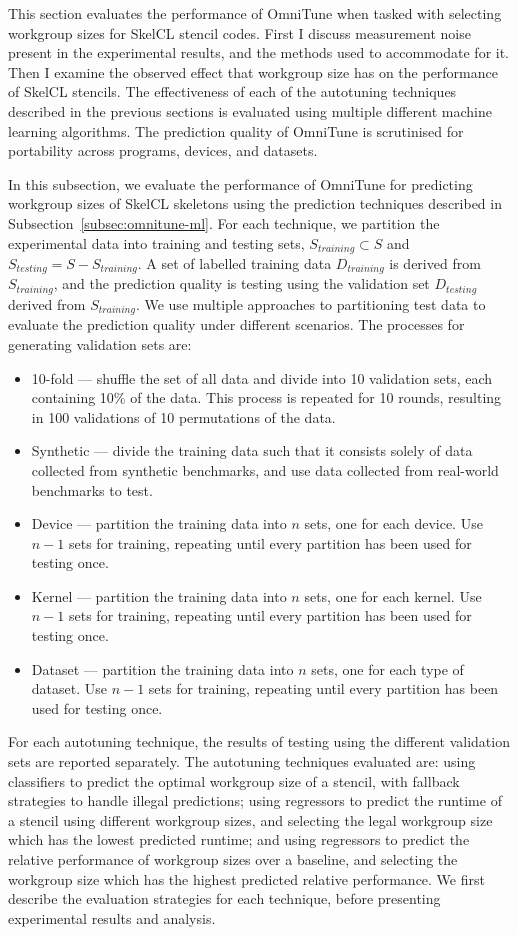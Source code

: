 \documentclass[nonatbib,preprint,10pt]{sigplanconf}
\begin{document}
This section evaluates the performance of OmniTune when tasked with
selecting workgroup sizes for SkelCL stencil codes. First I discuss
measurement noise present in the experimental results, and the methods
used to accommodate for it. Then I examine the observed effect that
workgroup size has on the performance of SkelCL stencils. The
effectiveness of each of the autotuning techniques described in the
previous sections is evaluated using multiple different machine
learning algorithms. The prediction quality of OmniTune is scrutinised
for portability across programs, devices, and datasets.


In this subsection, we evaluate the performance of OmniTune for
predicting workgroup sizes of SkelCL skeletons using the prediction
techniques described in Subsection~\ref{subsec:omnitune-ml}. For each
technique, we partition the experimental data into training and
testing sets, $S_{training} \subset S$ and
$S_{testing} = S - S_{training}$. A set of labelled training data
$D_{training}$ is derived from $S_{training}$, and the prediction
quality is testing using the validation set $D_{testing}$ derived from
$S_{training}$. We use multiple approaches to partitioning test data
to evaluate the prediction quality under different scenarios. The
processes for generating validation sets are:
%
\begin{itemize}
\item 10-fold --- shuffle the set of all data and divide into 10
  validation sets, each containing 10\% of the data. This process is
  repeated for 10 rounds, resulting in 100 validations of 10
  permutations of the data.
\item Synthetic --- divide the training data such that it consists
  solely of data collected from synthetic benchmarks, and use data
  collected from real-world benchmarks to test.
\item Device --- partition the training data into $n$ sets, one for
  each device. Use $n-1$ sets for training, repeating until every
  partition has been used for testing once.
\item Kernel --- partition the training data into $n$ sets, one for
  each kernel. Use $n-1$ sets for training, repeating until every
  partition has been used for testing once.
\item Dataset --- partition the training data into $n$ sets, one for
  each type of dataset. Use $n-1$ sets for training, repeating until
  every partition has been used for testing once.
\end{itemize}
%
For each autotuning technique, the results of testing using the
different validation sets are reported separately. The autotuning
techniques evaluated are: using classifiers to predict the optimal
workgroup size of a stencil, with fallback strategies to handle
illegal predictions; using regressors to predict the runtime of a
stencil using different workgroup sizes, and selecting the legal
workgroup size which has the lowest predicted runtime; and using
regressors to predict the relative performance of workgroup sizes over
a baseline, and selecting the workgroup size which has the highest
predicted relative performance. We first describe the evaluation
strategies for each technique, before presenting experimental results
and analysis.
\end{document}
